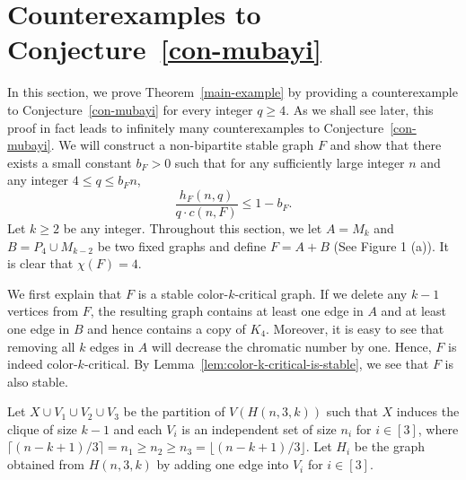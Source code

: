 \documentclass[10pt]{article}
\begin{document}
\section{Counterexamples to Conjecture~\ref{con-mubayi}}\label{Sec:example}
In this section, we prove Theorem~\ref{main-example} by providing a counterexample to Conjecture~\ref{con-mubayi} for every integer $q\geq 4$.
As we shall see later, this proof in fact leads to infinitely many counterexamples to Conjecture~\ref{con-mubayi}.
We will construct a non-bipartite stable graph $F$ and show that there exists a small constant $b_F>0$ such that
for any sufficiently large integer $n$ and any integer $4\leq q\leq b_F n$, $$\frac{h_F(n,q)}{q\cdot c(n,F)}\leq 1-b_F.$$
Let $k\geq 2$ be any integer.
Throughout this section, we let $A=M_k$ and $B=P_4\cup M_{k-2}$ be two fixed graphs and define $F=A+B$ (See Figure 1 (a)).
It is clear that $\chi(F)=4$.

We first explain that $F$ is a stable color-$k$-critical graph.
If we delete any $k-1$ vertices from $F$,
the resulting graph contains at least one edge in $A$ and at least one edge in $B$ and hence contains a copy of $K_4$.
Moreover, it is easy to see that removing all $k$ edges in $A$ will decrease the chromatic number by one.
Hence, $F$ is indeed color-$k$-critical.
By Lemma~\ref{lem:color-k-critical-is-stable}, we see that $F$ is also stable.

Let $X\cup V_1\cup V_2\cup V_3$ be the partition of $V(H(n,3,k))$ such that $X$ induces the clique of size $k-1$ and each $V_i$ is an independent set of size $n_i$ for $i\in [3]$,
where $\lceil(n-k+1)/3\rceil= n_1\geq n_2\geq n_3=\lfloor(n-k+1)/3\rfloor$.
Let $H_i$ be the graph obtained from $H(n,3,k)$ by adding one edge into $V_i$ for $i\in [3]$.
\end{document}

